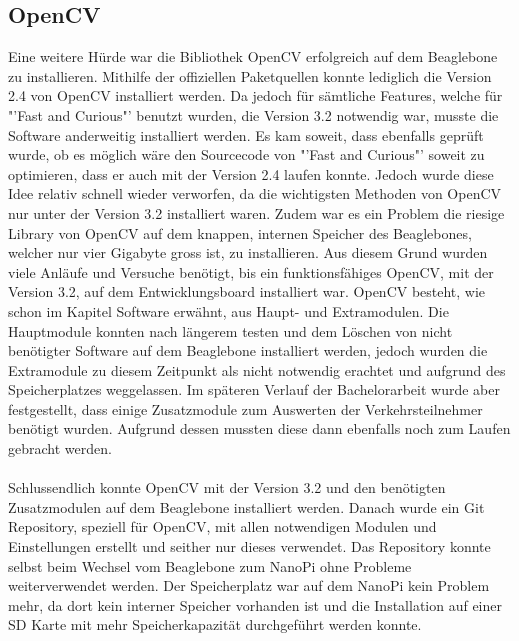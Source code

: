 \subsection{OpenCV}
Eine weitere Hürde war die Bibliothek OpenCV erfolgreich auf dem Beaglebone zu installieren. Mithilfe der offiziellen Paketquellen konnte lediglich die Version 2.4 von OpenCV installiert werden. Da jedoch für sämtliche Features, welche für "'Fast and Curious"' benutzt wurden, die Version 3.2 notwendig war, musste die Software anderweitig installiert werden. Es kam soweit, dass ebenfalls geprüft wurde, ob es möglich wäre den Sourcecode von "'Fast and Curious"' soweit zu optimieren, dass er auch mit der Version 2.4 laufen konnte. Jedoch wurde diese Idee relativ schnell wieder verworfen, da die wichtigsten Methoden von OpenCV nur unter der Version 3.2 installiert waren. Zudem war es ein Problem die riesige Library von OpenCV auf dem knappen, internen Speicher des Beaglebones, welcher nur vier Gigabyte gross ist, zu installieren. Aus diesem Grund wurden viele Anläufe und Versuche benötigt, bis ein funktionsfähiges OpenCV, mit der Version 3.2, auf dem Entwicklungsboard installiert war. OpenCV besteht, wie schon im Kapitel Software erwähnt, aus Haupt- und Extramodulen. Die Hauptmodule konnten nach längerem testen und dem Löschen von nicht benötigter Software auf dem Beaglebone installiert werden, jedoch wurden die Extramodule zu diesem Zeitpunkt als nicht notwendig erachtet und aufgrund des Speicherplatzes weggelassen. Im späteren Verlauf der Bachelorarbeit wurde aber festgestellt, dass einige Zusatzmodule zum Auswerten der Verkehrsteilnehmer benötigt wurden. Aufgrund dessen mussten diese dann ebenfalls noch zum Laufen gebracht werden.\\\\
Schlussendlich konnte OpenCV mit der Version 3.2 und den benötigten Zusatzmodulen auf dem Beaglebone installiert werden. Danach wurde ein Git Repository, speziell für OpenCV, mit allen notwendigen Modulen und Einstellungen erstellt und seither nur dieses verwendet. Das Repository konnte selbst beim Wechsel vom Beaglebone zum NanoPi ohne Probleme weiterverwendet werden. Der Speicherplatz war auf dem NanoPi kein Problem mehr, da dort kein interner Speicher vorhanden ist und die Installation auf einer SD Karte mit mehr Speicherkapazität durchgeführt werden konnte.